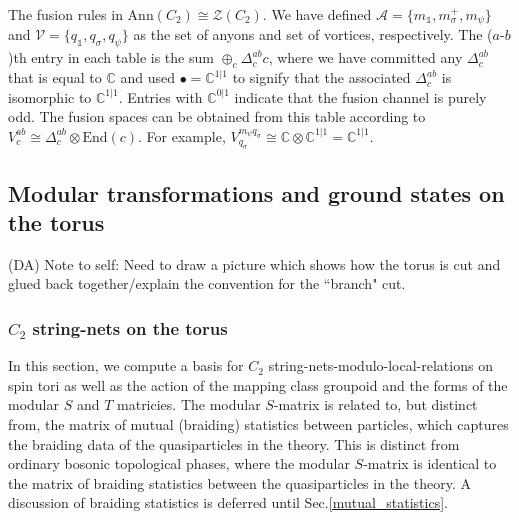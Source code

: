 \documentclass[12pt,a4paper]{article}
\newcommand{\tp}{\otimes}
\newcommand{\unit}{\mathds{1}}
\newcommand{\cc}{\mathbb{C}}
\newcommand{\mcz}{\mathcal{Z}}
\newcommand{\mca}{\mathcal{A}}
\newcommand{\mcv}{\mathcal{V}}
\newcommand{\dave}[1]{{\color{ao(english)}\footnotesize{(DA) #1}}}
\begin{document}
\begin{table}
 
\caption{ \label{fusiontable} The fusion rules in $\text{Ann}(C_2) \cong \mcz(C_2)$. 
	We have defined $\mca = \{ m_\unit, m_\sigma^+, m_\psi \} $ and $\mcv = \{ q_\unit, q_\sigma, q_\psi \}$ as the set of anyons and set of vortices, respectively.
	The ($a$-$b$)th entry in each table is the sum $\oplus_c \Delta_c^{ab} c$, where we have committed any $\Delta^{ab}_c$ that is equal to $\cc$ and used $\bullet = \mathbb{C}^{1|1}$ to signify that the associated $\Delta^{ab}_c$ is isomorphic to $\cc^{1|1}$.
		Entries with $\cc^{0|1}$ indicate that the fusion channel is purely odd. 
	The fusion spaces can be obtained from this table according to $V^{ab}_c \cong \Delta^{ab}_c \tp \text{End}(c)$.
	For example, $V^{m_\psi q_\sigma}_{q_\sigma} \cong \cc \tp \cc^{1|1} = \cc^{1|1}$.
	}
\end{table}






\subsection{Modular transformations and ground states on the torus} \label{modulartforms}
\dave{Note to self: Need to draw a picture which shows how the torus is cut and glued back 
together/explain the convention for the ``branch" cut.}


\subsubsection{$C_2$ string-nets on the torus} \label{c2_stringnets_torus}

In this section, we compute a basis for $C_2$ string-nets-modulo-local-relations on spin tori as well 
as the action of the mapping class groupoid and the forms of the modular $S$ and $T$ matricies.
The modular $S$-matrix is related to, but distinct from, the matrix of mutual (braiding) statistics between particles, which 
captures the braiding data of the quasiparticles in the theory.
This is distinct from ordinary bosonic topological phases, where the modular $S$-matrix is identical to the matrix of 
braiding statistics between the quasiparticles in the theory. 
A discussion of braiding statistics is deferred until Sec.\ref{mutual_statistics}. 
\end{document}
